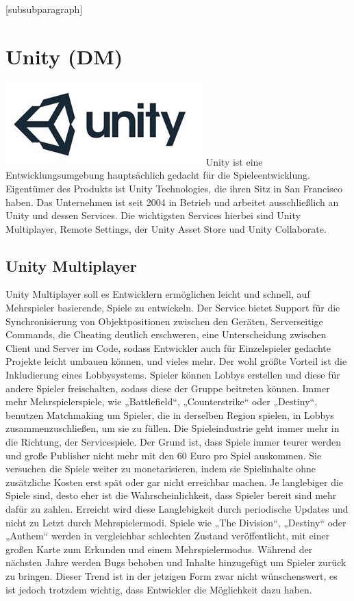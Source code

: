 \setcounter{tocdepth}{4}
\setcounter{secnumdepth}{4}
[subsubparagraph]
\section{Unity (DM)}
\includegraphics{images/unityLogo.png}
\newline
Unity ist eine Entwicklungsumgebung hauptsächlich gedacht für die Spieleentwicklung. Eigentümer des Produkts ist Unity Technologies, die ihren Sitz in San Francisco haben. 
Das Unternehmen ist seit 2004 in Betrieb und arbeitet ausschließlich an Unity und dessen Services. Die wichtigsten Services hierbei sind Unity Multiplayer, Remote Settings, der Unity Asset Store und Unity Collaborate. 

\subsection{Unity Multiplayer}
Unity Multiplayer soll es Entwicklern ermöglichen leicht und schnell, auf Mehrspieler basierende, Spiele zu entwickeln. Der Service bietet Support für die Synchronisierung von Objektpositionen zwischen den Geräten, Serverseitige Commands, die Cheating deutlich erschweren, eine Unterscheidung zwischen Client und Server im Code, sodass Entwickler auch für Einzelspieler gedachte Projekte leicht umbauen können, und vieles mehr. Der wohl größte Vorteil ist die Inkludierung eines Lobbysystems. Spieler können Lobbys erstellen und diese für andere Spieler freischalten, sodass diese der Gruppe beitreten können. Immer mehr Mehrspielerspiele, wie „Battlefield“, „Counterstrike“ oder „Destiny“, benutzen Matchmaking um Spieler, die in derselben Region spielen, in Lobbys zusammenzuschließen, um sie zu füllen. Die Spieleindustrie geht immer mehr in die Richtung, der Servicespiele. Der Grund ist, dass Spiele immer teurer werden und große Publisher nicht mehr mit den 60 Euro pro Spiel auskommen. Sie versuchen die Spiele weiter zu monetarisieren, indem sie Spielinhalte ohne zusätzliche Kosten erst spät oder gar nicht erreichbar machen. Je langlebiger die Spiele sind, desto eher ist die Wahrscheinlichkeit, dass Spieler bereit sind mehr dafür zu zahlen. Erreicht wird diese Langlebigkeit durch periodische Updates und nicht zu Letzt durch Mehrspielermodi. Spiele wie „The Division“, „Destiny“ oder „Anthem“ werden in vergleichbar schlechten Zustand veröffentlicht, mit einer großen Karte zum Erkunden und einem Mehrspielermodus. Während der nächsten Jahre werden Bugs behoben und Inhalte hinzugefügt um Spieler zurück zu bringen. Dieser Trend ist in der jetzigen Form zwar nicht wünschenswert, es ist jedoch trotzdem wichtig, dass Entwickler die Möglichkeit dazu haben. 

